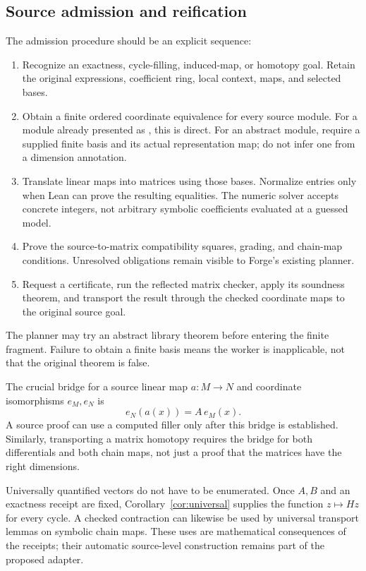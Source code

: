 \documentclass[11pt,letterpaper]{article}
\theoremstyle{definition}\newtheorem{definition}[theorem]{Definition}
\theoremstyle{remark}\newtheorem{remark}[theorem]{Remark}
\newcommand{\code}[1]{\texttt{\detokenize{#1}}}
\begin{document}
\subsection{Source admission and reification}
The admission procedure should be an explicit sequence:
\begin{enumerate}
\item Recognize an exactness, cycle-filling, induced-map, or homotopy goal.
Retain the original expressions, coefficient ring, local context, maps, and
selected bases.
\item Obtain a finite ordered coordinate equivalence for every source module.
For a module already presented as \code{Fin n -> Int}, this is direct. For an
abstract module, require a supplied finite basis and its actual representation
map; do not infer one from a dimension annotation.
\item Translate linear maps into matrices using those bases. Normalize entries
only when Lean can prove the resulting equalities. The numeric solver accepts
concrete integers, not arbitrary symbolic coefficients evaluated at a guessed
model.
\item Prove the source-to-matrix compatibility squares, grading, and chain-map
conditions. Unresolved obligations remain visible to Forge's existing planner.
\item Request a certificate, run the reflected matrix checker, apply its
soundness theorem, and transport the result through the checked coordinate
maps to the original source goal.
\end{enumerate}
The planner may try an abstract library theorem before entering the finite
fragment. Failure to obtain a finite basis means the worker is inapplicable,
not that the original theorem is false.

The crucial bridge for a source linear map $a:M\to N$ and coordinate
isomorphisms $e_M,e_N$ is
\[
 e_N(a(x))=A\,e_M(x).
\]
A source proof can use a computed filler only after this bridge is established.
Similarly, transporting a matrix homotopy requires the bridge for both
differentials and both chain maps, not just a proof that the matrices have the
right dimensions.

Universally quantified vectors do not have to be enumerated. Once $A,B$ and
an exactness receipt are fixed, Corollary~\ref{cor:universal} supplies the
function $z\mapsto Hz$ for every cycle. A checked contraction can likewise be
used by universal transport lemmas on symbolic chain maps. These uses are
mathematical consequences of the receipts; their automatic source-level
construction remains part of the proposed adapter.
\end{document}
